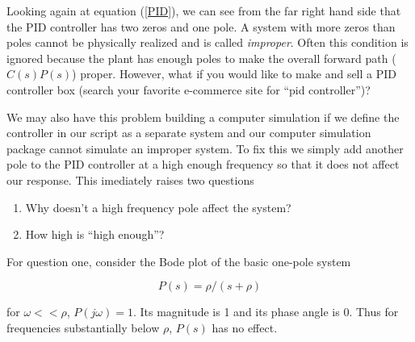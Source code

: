 %
%


Looking again at equation (\ref{PID}), we can see from the far right hand side that the PID controller has two zeros and one pole.   A system with more zeros than poles cannot be physically realized and is called {\it improper}.   Often this condition is ignored because the plant has enough poles to make the overall forward path ($C(s)P(s)$) proper.  However, what if you would like to make and sell a PID controller box
(search your favorite e-commerce site for ``pid controller'')?

We may also have this problem building a computer simulation if we define the controller in our script as a separate system and our computer simulation package    cannot simulate an improper system.
To fix this we simply add another pole to the PID controller at a high enough frequency so that it does not affect our response.  This imediately raises two questions




\begin{enumerate}
  \item Why doesn't a high frequency pole affect the system?
  \item How high is ``high enough''?
\end{enumerate}






For question one, consider the Bode plot of the basic one-pole system	%


\[
P(s) = \rho/(s+\rho)
\]

for $\omega << \rho$, $P(j\omega) = 1$.  Its magnitude is 1 and its phase angle is 0.
Thus for frequencies substantially below $\rho$, $P(s)$ has no effect.	%





